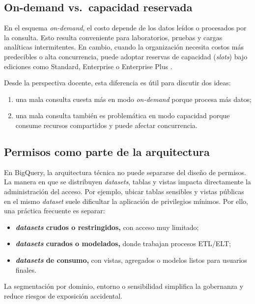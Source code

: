 \documentclass[12pt]{article}
\begin{document}
\subsection{On-demand vs.\ capacidad reservada}
En el esquema \textit{on-demand}, el costo depende de los datos leídos o procesados por la consulta. Esto resulta conveniente para laboratorios, pruebas y cargas analíticas intermitentes. En cambio, cuando la organización necesita costos más predecibles o alta concurrencia, puede adoptar reservas de capacidad (\textit{slots}) bajo ediciones como Standard, Enterprise o Enterprise Plus \cite{gcp_bigquery_editions,gcp_bigquery_pricing}.

Desde la perspectiva docente, esta diferencia es útil para discutir dos ideas:

\begin{enumerate}[label=\textbf{P\arabic*.}, leftmargin=*]
\item una mala consulta cuesta más en modo \textit{on-demand} porque procesa más datos;
\item una mala consulta también es problemática en modo capacidad porque consume recursos compartidos y puede afectar concurrencia.
\end{enumerate}

\subsection{Permisos como parte de la arquitectura}
En BigQuery, la arquitectura técnica no puede separarse del diseño de permisos. La manera en que se distribuyen \textit{datasets}, tablas y vistas impacta directamente la administración del acceso. Por ejemplo, ubicar tablas sensibles y vistas públicas en el mismo \textit{dataset} suele dificultar la aplicación de privilegios mínimos. Por ello, una práctica frecuente es separar:

\begin{itemize}[leftmargin=*]
\item \textbf{\textit{datasets} crudos o restringidos,} con acceso muy limitado;
\item \textbf{\textit{datasets} curados o modelados,} donde trabajan procesos ETL/ELT;
\item \textbf{\textit{datasets} de consumo,} con vistas, agregados o modelos listos para usuarios finales.
\end{itemize}

La segmentación por dominio, entorno o sensibilidad simplifica la gobernanza y reduce riesgos de exposición accidental.
\end{document}
